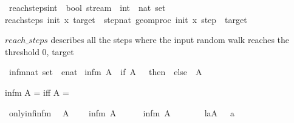 \begin{isabellebody}
\isamarkupfalse%
\ reach{\isacharunderscore}{\kern0pt}steps{\isacharcolon}{\kern0pt}{\isacharcolon}{\kern0pt}{\isachardoublequoteopen}int\ {\isasymRightarrow}\ bool\ stream\ {\isasymRightarrow}\ int\ {\isasymRightarrow}\ nat\ set{\isachardoublequoteclose}\isanewline
{\isachardoublequoteopen}reach{\isacharunderscore}{\kern0pt}steps\ init\ x\ target\ {\isacharequal}{\kern0pt}\ {\isacharbraceleft}{\kern0pt}step{\isacharcolon}{\kern0pt}{\isacharcolon}{\kern0pt}nat{\isachardot}{\kern0pt}\ geom{\isacharunderscore}{\kern0pt}proc\ init\ x\ step\ {\isasymin}\ {\isacharbraceleft}{\kern0pt}{}{\isacharcomma}{\kern0pt}target{\isacharbraceright}{\kern0pt}{\isacharbraceright}{\kern0pt}{\isachardoublequoteclose}%
\begin{isamarkuptext}%
$reach\_steps$ describes all the steps where the input random walk reaches the threshold {0, target}%
\end{isamarkuptext}\isamarkuptrue%
\isamarkupfalse%
\ infm{\isacharcolon}{\kern0pt}{\isacharcolon}{\kern0pt}{\isachardoublequoteopen}nat\ set\ {\isasymRightarrow}\ enat{\isachardoublequoteclose}\ \isanewline
{\isachardoublequoteopen}infm\ A\ {\isacharequal}{\kern0pt}\ {\isacharparenleft}{\kern0pt}if\ A\ {\isacharequal}{\kern0pt}\ {\isacharbraceleft}{\kern0pt}{\isacharbraceright}{\kern0pt}\ then\ {\isasyminfinity}\ else\ {\isasymSqinter}\ A{\isacharparenright}{\kern0pt}{\isachardoublequoteclose}%
\begin{isamarkuptext}%
infm A = {} iff A = {}%
\end{isamarkuptext}\isamarkuptrue%
\isamarkupfalse%
\ only{\isacharunderscore}{\kern0pt}inf{\isacharunderscore}{\kern0pt}infm{\isacharcolon}{\kern0pt}\isanewline
\ \ A\ {\isasymnoteq}\ {\isacharbraceleft}{\kern0pt}{\isacharbraceright}{\kern0pt}{\isachardoublequoteclose}\isanewline
\ \ infm\ A\ {\isasymnoteq}\ {\isasyminfinity}{\isachardoublequoteclose}\isanewline
%
\isadelimproof
%
\endisadelimproof
%
\isatagproof
{}\isamarkupfalse%
\isanewline
\ \ \isamarkupfalse%
\ {\isachardoublequoteopen}infm\ A\ {\isacharequal}{\kern0pt}\ {\isasyminfinity}{\isachardoublequoteclose}\isanewline
\ \ \isamarkupfalse%
\ \isamarkupfalse%
\ l{\isacharcolon}{\kern0pt}{\isachardoublequoteopen}{\isasymforall}a{\isasymin}A{\isachardot}{\kern0pt}\ {\isasyminfinity}\ {\isasymle}\ a{\isachardoublequoteclose}\isanewline

\end{isabellebody}
